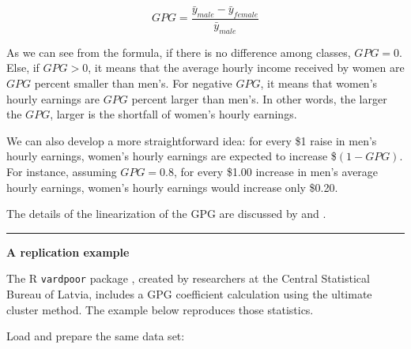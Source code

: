 \documentclass[
]{book}
\begin{document}
\[ GPG = \frac{ \bar{y}_{male} - \bar{y}_{female} }{ \bar{y}_{male} } \]

As we can see from the formula, if there is no difference among classes, \(GPG = 0\). Else, if \(GPG > 0\), it means that the average hourly income received by women are \(GPG\) percent smaller than men's. For negative \(GPG\), it means that women's hourly earnings are \(GPG\) percent larger than men's. In other words, the larger the \(GPG\), larger is the shortfall of women's hourly earnings.

We can also develop a more straightforward idea: for every \$1 raise in men's hourly earnings, women's hourly earnings are expected to increase \$\((1-GPG)\). For instance, assuming \(GPG = 0.8\), for every \$1.00 increase in men's average hourly earnings, women's hourly earnings would increase only \$0.20.

The details of the linearization of the GPG are discussed by \textcite{deville1999} and \textcite{osier2009}.

\begin{center}\rule{0.5\linewidth}{0.5pt}\end{center}

\textbf{A replication example}

The R \texttt{vardpoor} package \autocite{vardpoor}, created by researchers at the Central Statistical Bureau of Latvia, includes a GPG coefficient calculation using the ultimate cluster method. The example below reproduces those statistics.

Load and prepare the same data set:
\end{document}
